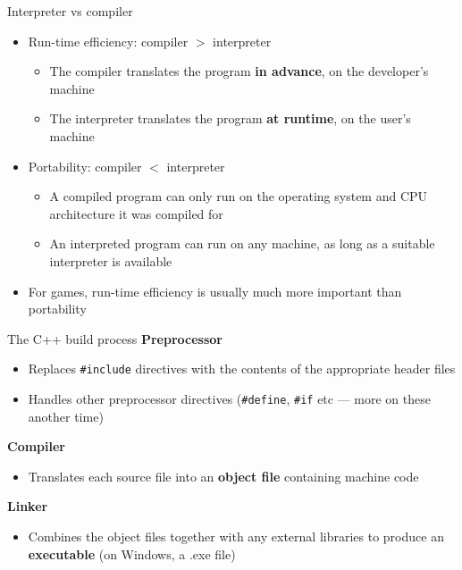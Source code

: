\begin{frame}{Interpreter vs compiler}
    \begin{itemize}
        \item Run-time efficiency: compiler $>$ interpreter
        \begin{itemize}
            \item The compiler translates the program \textbf{in advance}, on the developer's machine
            \item The interpreter translates the program \textbf{at runtime}, on the user's machine
        \end{itemize}
        \item Portability: compiler $<$ interpreter
        \begin{itemize}
            \item A compiled program can only run on the operating system and CPU architecture it was compiled for
            \item An interpreted program can run on any machine, as long as a suitable interpreter is available
        \end{itemize}
        \item For games, run-time efficiency is usually much more important than portability
    \end{itemize}
\end{frame}

\begin{frame}[fragile]{The C++ build process}
    \textbf{Preprocessor}
    \begin{itemize}
        \item Replaces \lstinline{#include} directives with the contents of the appropriate header files
        \item Handles other preprocessor directives (\lstinline{#define}, \lstinline{#if} etc --- more on these another time)
    \end{itemize}
    \textbf{Compiler}
    \begin{itemize}
        \item Translates each source file into an \textbf{object file} containing machine code
    \end{itemize}
    \textbf{Linker}
    \begin{itemize}
        \item Combines the object files together with any external libraries to produce an \textbf{executable}
            (on Windows, a .exe file)
    \end{itemize}
\end{frame}

